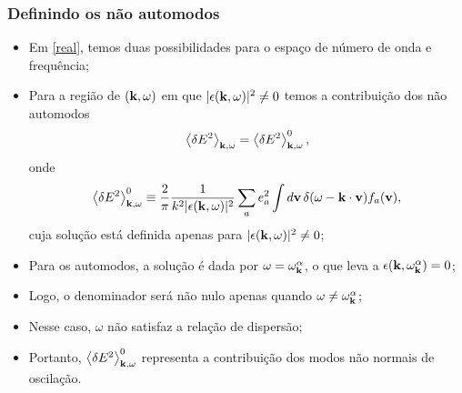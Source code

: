 \documentclass[10pt,aspectratio=1610,lualatex]{beamer}
\begin{document}
\begin{frame}
  \frametitle{Definindo os não automodos}
  \begin{itemize}
    \item Em \eqref{real}, temos duas possibilidades para o
    espaço de número de onda e frequência;
    \vspace{0.15cm}
    \pause
    \item Para a região de $({\bf k},\omega)$ em que
    $|\epsilon({\bf k},\omega)|^2\ne 0$ temos a contribuição
    dos não automodos
    \begin{equation}
      \label{balance}
      \left\langle \delta E^2 \right\rangle_{{\bf k},\omega}
      =\left\langle \delta E^2 \right\rangle_{{\bf k},\omega}^0,
    \end{equation}
    onde
    \begin{equation}
      \label{field-fluc}
      \left\langle \delta E^2 \right\rangle_{{\bf k},\omega}^0
      \equiv \frac{2}{\pi}\frac{1}{k^2|\epsilon({\bf k},\omega)|^2}
      \sum_a e_a^2 \int d{\bf v}\, \delta(\omega-{\bf k \cdot v})
      f_a({\bf v}),
    \end{equation}
    cuja solução está definida apenas para
    $|\epsilon({\bf k},\omega)|^2\ne 0$;
    \vspace{0.15cm}
    \pause
    \item Para os automodos, a solução é dada por
    $\omega = \omega_{\bf k}^\alpha$, o que leva a
    $\epsilon({\bf k},\omega_{\bf k}^\alpha)=0$;
    \vspace{0.15cm}
    \pause
    \item Logo, o denominador será não nulo apenas quando
    $\omega \ne \omega_{\bf k}^\alpha$;
    \vspace{0.15cm}
    \pause
    \item Nesse caso, $\omega$ não satisfaz a relação de dispersão;
    \vspace{0.15cm}
    \pause
    \item Portanto, $\left< \delta E^2 \right>_{{\bf k},\omega}^0$
    representa a contribuição dos modos não normais de oscilação.
  \end{itemize}
\end{frame}
\end{document}
